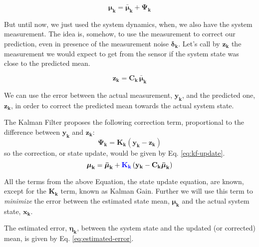 \documentclass[12pt]{article}
\newcommand{\bvec}[1]{\boldsymbol{\mathbf{#1}}} %
\newcommand{\mat}[1]{\boldsymbol{\mathbf{#1}}}
\newcommand{\parentheses}[1]{\left(#1\right)}
\newcommand{\mb}[1]{{\boldsymbol{#1}}} %
\newcommand{\blue}[1]{\color{blue}#1\color{black}}
\begin{document}
\begin{equation}
    \mb{\mu}_\mathbf{k} = \mb{\bar{\mu}}_\mathbf{k} + \mat{\Psi_k}
\end{equation}

But until now, we just used the system dynamics, when, we also have the system measurement. The idea is, somehow, to use the measurement to correct our prediction, even in presence of the measurement noise $\mb{\delta}_\mathbf{k}$. Let's call by $\bvec{z_k}$ the measurement we would expect to get from the sensor if the system state was close to the predicted mean.

\begin{equation}
    \bvec{z_k} = \mat{C_k}\, \mb{\bar{\mu}}_\mathbf{k}
\end{equation}

We can use the error between the actual measurement, $\bvec{y_k}$, and the predicted one, $\bvec{z_k}$, in order to correct the predicted mean towards the actual system state. 

The Kalman Filter proposes the following correction term, proportional to the difference between $\bvec{y_k}$ and $\bvec{z_k}$:
\begin{equation}
    \mat{\Psi_k} = \mat{K_k}\parentheses{\bvec{y_k} - \bvec{z_k}}
    \label{eq:kalman-correction-term}
\end{equation}
so the correction, or state update, would be given by Eq. \ref{eq:kf-update}.
\begin{equation}
    \mb{\mu}_\mathbf{k} = \mb{\bar{\mu}}_\mathbf{k} + \blue{\mat{K_k}}\parentheses{\bvec{y_k} - \mat{C_k}\mb{\bar{\mu}}_\mathbf{k}}
    \label{eq:kf-update}
\end{equation}

All the terms from the above Equation, the state update equation, are known, except for the $\mat{K_k}$ term, known as Kalman Gain. Further we will use this term to \emph{minimize} the error between the estimated state mean, $\mb{\mu}_\mathbf{k}$ and the actual system state, $\bvec{x_k}$.

The estimated error, $\mb{\eta}_\mathbf{k}$, between the system state and the updated (or corrected) mean, is given by Eq. \ref{eq:estimated-error}.
\end{document}
